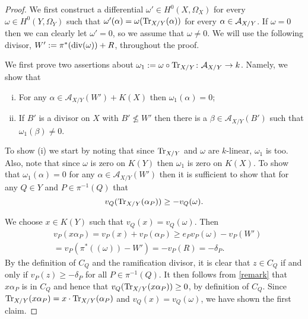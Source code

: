    \begin{proof}
    We first construct a differential $\omega'\in H^0(X,\Omega_X)$ for every $\omega\in H^0(Y,\Omega_Y)$ such that $\omega'(\alpha) = \omega(\operatorname{Tr}_{X/Y}(\alpha))$ for every $\alpha \in {\mathcal A}_{X/Y}$.
    If $\omega = 0$ then we can clearly let $\omega' = 0$, so we assume that $\omega \neq 0$.
    We will use the following divisor, $W' := \pi^*(\operatorname{div} (\omega)) + R$, throughout the proof.
    
    We first prove two assertions about $\omega_1:= \omega\circ \operatorname{Tr}_{X/Y} \colon \mathcal{A}_{X/Y} \rightarrow k$.
    Namely, we show that
        \begin{enumerate}[(i)]
        \item For any $\alpha \in \mathcal{A}_{X/Y}(W') + K(X)$ then $\omega_1(\alpha) = 0$;
        \item If $B'$ is a divisor on $X$ with $B' \nleq W'$ then there is a $\beta \in \mathcal{A}_{X/Y}(B')$ such that $\omega_1(\beta) \neq 0$.
        \end{enumerate}
    To show (i) we start by noting that since $\operatorname{Tr}_{X/Y}$ and $\omega$ are $k$-linear, $\omega_1$ is too.
    Also, note that since $\omega$ is zero on $K(Y)$ then $\omega_1$ is zero on $K(X)$.
    To show that $\omega_1(\alpha) = 0$ for any $\alpha \in \mathcal{A}_{X/Y}(W')$ then it is sufficient to show that for any $Q\in Y$ and $P\in \pi^{-1}(Q)$ that
        \[
        v_Q(\operatorname{Tr}_{X/Y}(\alpha_P)) \geq -v_Q(\omega).
        \]
    
    We choose $x\in K(Y)$ such that $v_Q(x) = v_Q(\omega)$.
    Then
        \begin{align}\label{remark}
        & v_P(x \alpha_P) = v_P(x) + v_P(\alpha_P) \geq e_P v_P(\omega) - v_P(W') \nonumber \\
        & = v_P(\pi^*((\omega)) - W') = -v_P(R) = -\delta_P. 
        \end{align}
    By the definition of $C_Q$ and the ramification divisor, it is clear that $z\in C_Q$ if and only if $v_P(z)\geq -\delta_P$ for all $P\in \pi^{-1}(Q)$.
    It then follows from \eqref{remark} that $x \alpha_P$ is in $C_Q$ and hence that $v_Q(\operatorname{Tr}_{X/Y}(x \alpha_P)) \geq 0$, by definition of $C_Q$.
    Since $\operatorname{Tr}_{X/Y}(x \alpha_P) = x\cdot \operatorname{Tr}_{X/Y}(\alpha_P)$ and $v_Q(x) = v_Q(\omega)$, we have shown the first claim.
    

\end{proof}
